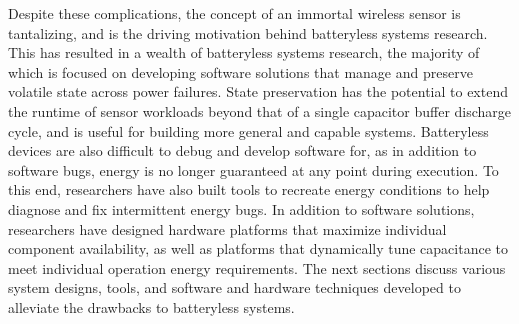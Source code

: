 Despite these complications, the concept of an immortal wireless sensor is tantalizing, and is the driving motivation behind batteryless systems research.
This has resulted in a wealth of batteryless systems research, the majority of which is focused on developing software solutions that manage and preserve volatile state across power failures.
State preservation has the potential to extend the runtime of sensor workloads beyond that of a single capacitor buffer discharge cycle, and is useful for building more general and capable systems.
Batteryless devices are also difficult to debug and develop software for, as in addition to software bugs, energy is no longer guaranteed at any point during execution.
To this end, researchers have also built tools to recreate energy conditions to help diagnose and fix intermittent energy bugs.
In addition to software solutions, researchers have designed hardware platforms that maximize individual component availability, as well as platforms that dynamically tune capacitance to meet individual operation energy requirements.
The next sections discuss various system designs, tools, and software and hardware techniques developed to alleviate the drawbacks to batteryless systems.

